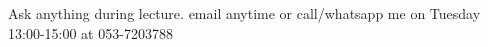 \documentclass[preview]{standalone}
\begin{document}
Ask anything during lecture. email anytime or call/whatsapp me on Tuesday 13:00-15:00 at 053-7203788\\
\end{document}
